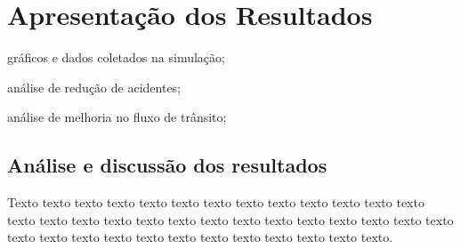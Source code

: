 \chapter{Apresentação dos Resultados}

\begin{alineas}
    \item gráficos e dados coletados na simulação;
    \item análise de redução de acidentes;
    \item análise de melhoria no fluxo de trânsito;
\end{alineas}

\section{Análise e discussão dos resultados}

Texto texto texto texto texto texto texto texto texto texto texto texto texto texto texto texto texto texto texto texto texto texto texto texto texto texto texto texto texto texto texto texto texto texto texto texto texto texto texto.
